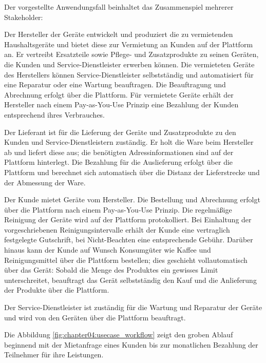 Der vorgestellte Anwendungsfall beinhaltet das Zusammenspiel mehrerer Stakeholder:
\begin{description}
\label{description:chapter04:stakeholder}
  \item[Hersteller] Der Hersteller der Geräte entwickelt und produziert die zu vermietenden Haushaltsgeräte und bietet diese zur Vermietung an Kunden auf der Plattform an. Er vertreibt Ersatzteile sowie Pflege- und Zusatzprodukte zu seinen Geräten, die Kunden und Service-Dienstleister erwerben können. Die vermieteten Geräte des Herstellers können Service-Dienstleister selbstständig und automatisiert für eine Reparatur oder eine Wartung beauftragen. Die Beauftragung und Abrechnung erfolgt über die Plattform. Für vermietete Geräte erhält der Hersteller nach einem Pay-as-You-Use Prinzip eine Bezahlung der Kunden entsprechend ihres Verbrauches.
  \item[Lieferant] Der Lieferant ist für die Lieferung der Geräte und Zusatzprodukte zu den Kunden und Service-Dienstleistern zuständig. Er holt die Ware beim Hersteller ab und liefert diese aus; die benötigten Adressinformationen sind auf der Plattform hinterlegt. Die Bezahlung für die Auslieferung erfolgt über die Plattform und berechnet sich automatisch über die Distanz der Lieferstrecke und der Abmessung der Ware.
  \item[Kunde] Der Kunde mietet Geräte vom Hersteller. Die Bestellung und Abrechnung erfolgt über die Plattform nach einem Pay-as-You-Use Prinzip. Die regelmäßige Reinigung der Geräte wird auf der Plattform protokolliert. Bei Einhaltung der vorgeschriebenen Reinigungsintervalle erhält der Kunde eine vertraglich festgelegte Gutschrift, bei Nicht-Beachten eine entsprechende Gebühr.  Darüber hinaus kann der Kunde auf Wunsch Konsumgüter wie Kaffee und Reinigungsmittel über die Plattform bestellen; dies geschieht vollautomatisch über das Gerät: Sobald die Menge des Produktes ein gewisses Limit unterschreitet, beauftragt das Gerät selbstständig den Kauf und die Anlieferung der Produkte über die Plattform.
  \item[Service-Dienstleister] Der Service-Dienstleister ist zuständig für die Wartung und Reparatur der Geräte und wird von den Geräten über die Plattform beauftragt.
\end{description}

Die Abbildung \ref{fig:chapter04:usecase_workflow} zeigt den groben Ablauf beginnend mit der Mietanfrage eines Kunden bis zur monatlichen Bezahlung der Teilnehmer für ihre Leistungen.

